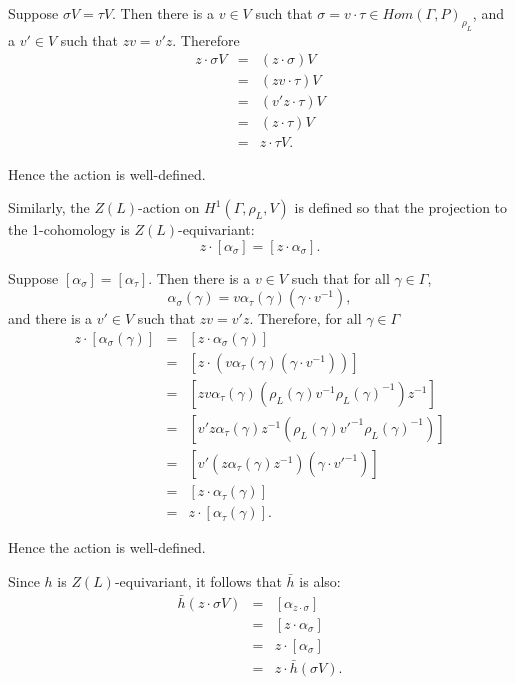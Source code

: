 Suppose $\sigma V = \tau V$. Then there is a $v \in V$ such that $\sigma = v \cdot \tau \in Hom(\Gamma, P)_{\rho_L}$, and a $v' \in V$ such that $zv = v' z$. Therefore
\begin{eqnarray*}
  z \cdot \sigma V &=& (z \cdot \sigma)V \\
  &=& (zv \cdot \tau) V \\
  &=& (v' z \cdot \tau) V \\
  &=& (z \cdot \tau) V \\
  &=& z \cdot \tau V.
\end{eqnarray*}

Hence the action is well-defined.

Similarly, the $Z(L)$-action on $H^1(\Gamma, \rho_L, V)$ is defined so that the projection to the 1-cohomology is $Z(L)$-equivariant:
\begin{displaymath}
  z \cdot [\alpha_\sigma] = [z \cdot \alpha_\sigma].
\end{displaymath}

Suppose $[\alpha_\sigma] = [\alpha_\tau]$. Then there is a $v \in V$ such that for all $\gamma \in \Gamma$,
\begin{displaymath}
  \alpha_\sigma(\gamma) = v \alpha_\tau(\gamma) (\gamma \cdot v^{-1}),
\end{displaymath}
and there is a $v' \in V$ such that $zv = v' z$. Therefore, for all $\gamma \in \Gamma$
\begin{eqnarray*}
  z \cdot [\alpha_\sigma(\gamma)] &=& [z \cdot \alpha_\sigma(\gamma)] \\
  &=& [z \cdot (v \alpha_\tau(\gamma) (\gamma \cdot v^{-1}))] \\
  &=& [z v \alpha_\tau(\gamma) (\rho_L(\gamma) v^{-1} \rho_L(\gamma)^{-1})z^{-1}] \\
  &=& [v' z \alpha_\tau(\gamma) z^{-1} (\rho_L(\gamma) v'^{-1} \rho_L(\gamma)^{-1})] \\
  &=& [v' (z \alpha_\tau(\gamma) z^{-1}) (\gamma \cdot v'^{-1})] \\
  &=& [z \cdot \alpha_\tau(\gamma)] \\
  &=& z \cdot [\alpha_\tau(\gamma)].
\end{eqnarray*}

Hence the action is well-defined.

Since $h$ is $Z(L)$-equivariant, it follows that $\bar{h}$ is also:
\begin{eqnarray*}
  \bar{h}(z \cdot \sigma V) &=& [\alpha_{z \cdot \sigma}] \\
  &=& [z \cdot \alpha_\sigma] \\
  &=& z \cdot [\alpha_\sigma] \\
  &=& z \cdot \bar{h}(\sigma V).
\end{eqnarray*}


